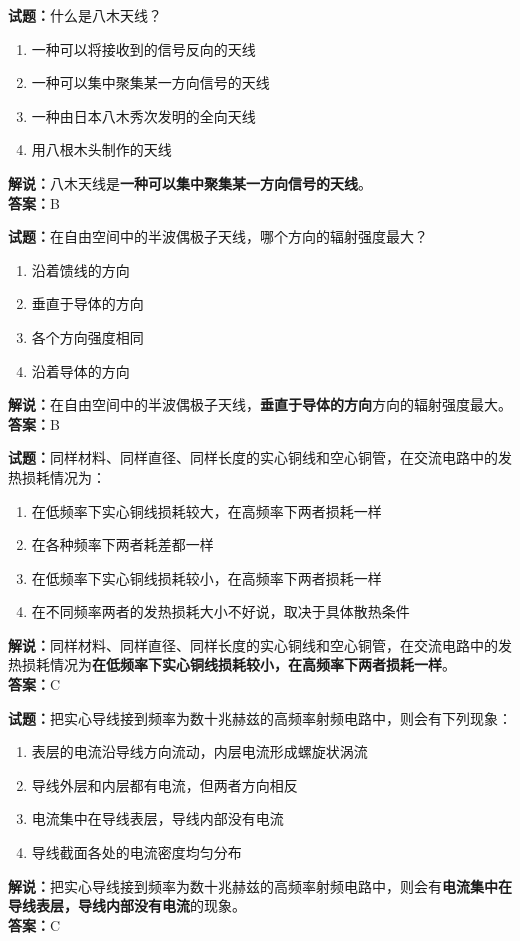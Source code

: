 \documentclass{ctexbook}
\begin{document}
\vspace{1em}

\textbf{试题：}什么是八木天线？
\begin{enumerate}[leftmargin=3em]
  \item 一种可以将接收到的信号反向的天线
  \item 一种可以集中聚集某一方向信号的天线
  \item 一种由日本八木秀次发明的全向天线
  \item 用八根木头制作的天线
\end{enumerate}
\noindent\textbf{解说：}八木天线是\textbf{一种可以集中聚集某一方向信号的天线}。\\\noindent\textbf{答案：}B

\vspace{1em}

\textbf{试题：}在自由空间中的半波偶极子天线，哪个方向的辐射强度最大？
\begin{enumerate}[leftmargin=3em]
  \item 沿着馈线的方向
  \item 垂直于导体的方向
  \item 各个方向强度相同
  \item 沿着导体的方向
\end{enumerate}
\noindent\textbf{解说：}在自由空间中的半波偶极子天线，\textbf{垂直于导体的方向}方向的辐射强度最大。\\\noindent\textbf{答案：}B

\vspace{1em}

\textbf{试题：}同样材料、同样直径、同样长度的实心铜线和空心铜管，在交流电路中的发热损耗情况为：
\begin{enumerate}[leftmargin=3em]
  \item 在低频率下实心铜线损耗较大，在高频率下两者损耗一样
  \item 在各种频率下两者耗差都一样
  \item 在低频率下实心铜线损耗较小，在高频率下两者损耗一样
  \item 在不同频率两者的发热损耗大小不好说，取决于具体散热条件
\end{enumerate}
\noindent\textbf{解说：}同样材料、同样直径、同样长度的实心铜线和空心铜管，在交流电路中的发热损耗情况为\textbf{在低频率下实心铜线损耗较小，在高频率下两者损耗一样}。\\\noindent\textbf{答案：}C

\vspace{1em}

\textbf{试题：}把实心导线接到频率为数十兆赫兹的高频率射频电路中，则会有下列现象：
\begin{enumerate}[leftmargin=3em]
  \item 表层的电流沿导线方向流动，内层电流形成螺旋状涡流
  \item 导线外层和内层都有电流，但两者方向相反
  \item 电流集中在导线表层，导线内部没有电流
  \item 导线截面各处的电流密度均匀分布
\end{enumerate}
\noindent\textbf{解说：}把实心导线接到频率为数十兆赫兹的高频率射频电路中，则会有\textbf{电流集中在导线表层，导线内部没有电流}的现象。\\\noindent\textbf{答案：}C
\end{document}
